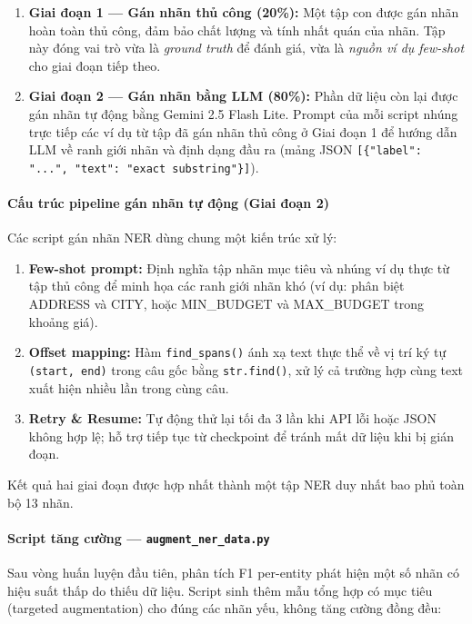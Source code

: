 \documentclass[12pt, a4paper]{report}
\begin{document}
\begin{enumerate}
  \item \textbf{Giai đoạn 1 --- Gán nhãn thủ công (20\%):}
        Một tập con được gán nhãn hoàn toàn thủ công, đảm bảo
        chất lượng và tính nhất quán của nhãn.
        Tập này đóng vai trò vừa là \textit{ground truth} để đánh giá,
        vừa là \textit{nguồn ví dụ few-shot} cho giai đoạn tiếp theo.

  \item \textbf{Giai đoạn 2 --- Gán nhãn bằng LLM (80\%):}
        Phần dữ liệu còn lại được gán nhãn tự động bằng
        Gemini 2.5 Flash Lite. Prompt của mỗi script nhúng trực tiếp
        các ví dụ từ tập đã gán nhãn thủ công ở Giai đoạn 1
        để hướng dẫn LLM về ranh giới nhãn và định dạng đầu ra
        (mảng JSON \texttt{[\{"label": "...", "text": "exact substring"\}]}).
\end{enumerate}

\paragraph{Cấu trúc pipeline gán nhãn tự động (Giai đoạn 2)}
Các script gán nhãn NER dùng chung một kiến trúc xử lý:

\begin{enumerate}
  \item \textbf{Few-shot prompt:} Định nghĩa tập nhãn mục tiêu và
        nhúng ví dụ thực từ tập thủ công để minh họa các ranh giới
        nhãn khó (ví dụ: phân biệt ADDRESS và CITY,
        hoặc MIN\_BUDGET và MAX\_BUDGET trong khoảng giá).
  \item \textbf{Offset mapping:} Hàm \texttt{find\_spans()} ánh xạ
        text thực thể về vị trí ký tự \texttt{(start, end)} trong câu gốc
        bằng \texttt{str.find()}, xử lý cả trường hợp cùng text
        xuất hiện nhiều lần trong cùng câu.
  \item \textbf{Retry \& Resume:} Tự động thử lại tối đa 3 lần khi
        API lỗi hoặc JSON không hợp lệ; hỗ trợ tiếp tục từ checkpoint
        để tránh mất dữ liệu khi bị gián đoạn.
\end{enumerate}

Kết quả hai giai đoạn được hợp nhất thành một tập NER duy nhất
bao phủ toàn bộ 13 nhãn.

\paragraph{Script tăng cường --- \texttt{augment\_ner\_data.py}}
Sau vòng huấn luyện đầu tiên, phân tích F1 per-entity phát hiện
một số nhãn có hiệu suất thấp do thiếu dữ liệu.
Script sinh thêm mẫu tổng hợp có mục tiêu (targeted augmentation)
cho đúng các nhãn yếu, không tăng cường đồng đều:
\end{document}
